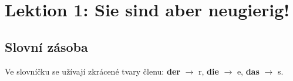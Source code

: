 \setchaptertoc
\chapter{Lektion 1: Sie sind aber neugierig!}\label{NJ:chap_N1_L1}

\section*{Slovní zásoba}
  Ve slovníčku se užívají zkrácené tvary členu: \textbf{der} \(\rightarrow\) r, \textbf{die} 
  \(\rightarrow\) e, \textbf{das} \(\rightarrow\) s.  
  
